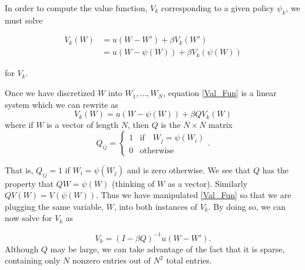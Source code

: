 In order to compute the value function, $V_k$ corresponding to a given policy $\psi_k$, we must solve

\begin{align}\label{Val_Fun}
V_k(W) &= u(W-W') + \beta V_k(W')\\
			 &= u(W-\psi(W)) + \beta V_k(\psi(W))
\end{align}

for $V_k$.

Once we have discretized $W$ into $W_1,\ldots,W_N$, equation \eqref{Val_Fun} is a linear system which we can rewrite as
\begin{equation}\label{linear}
V_k(W) = u(W-\psi(W)) + \beta QV_k(W)
\end{equation}
where if $W$ is a vector of length $N$, then $Q$ is the $N\times N$ matrix
\begin{equation}
Q_{ij} = \left\{
     \begin{array}{lr}
       1 & \text{if} \quad  W_j = \psi(W_i)\\
       0 & \text{otherwise}
     \end{array}
   \right. .
\end{equation}

That is, $Q_{ij} = 1$ if $W_i = \psi(W_j)$ and is zero otherwise.  We see that $Q$ has the property that $QW = \psi(W)$ (thinking of $W$ as a vector).  Similarly $QV(W) = V(\psi(W))$.  Thus we have manipulated \ref{Val_Fun} so that we are plugging the same variable, $W$, into both instances of $V_k$.  By doing so, we can now solve for $V_k$ as

\begin{equation}
V_k = (I-\beta Q)^{-1}u(W-W').
\end{equation}
Although $Q$ may be large, we can take advantage of the fact that it is sparse, containing only $N$ nonzero entries out of $N^2$ total entries.

